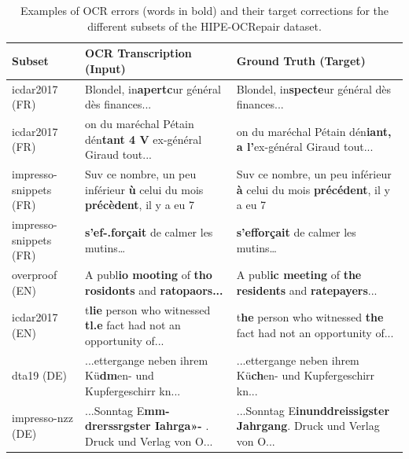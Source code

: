 \documentclass[11pt]{extarticle}
\begin{document}
\begin{table}[H]
    \centering
    \renewcommand{\arraystretch}{1.5}
    \begin{tabular}{>{\raggedright\arraybackslash}p{2.5cm} >{\raggedright\arraybackslash}p{6cm} >{\raggedright\arraybackslash}p{6cm}}
    \toprule
    \textbf{Subset} & \textbf{OCR Transcription (Input)} & \textbf{Ground Truth (Target)} \\
    \midrule
    
    icdar2017 (FR) & 
    Blondel, in\textbf{apertc}ur général dès finances... & 
    Blondel, in\textbf{specte}ur général dès finances... \\
    
    icdar2017 (FR) & 
    on du maréchal Pétain dén\textbf{tant 4 V  }ex-général Giraud tout... & 
    on du maréchal Pétain dén\textbf{iant, a l'}ex-général Giraud tout... \\
    
    impresso-snippets (FR) & 
    Suv ce nombre, un peu inférieur \textbf{ù} celui du mois \textbf{précèdent}, il y a eu 7 & 
    Suv ce nombre, un peu inférieur \textbf{à} celui du mois \textbf{précédent}, il y a eu 7 \\
    
    impresso-snippets (FR) & 
    \textbf{s'ef-.forçait} de calmer les mutins\dots & 
    \textbf{s'efforçait} de calmer les mutins\dots \\
    
    \midrule
    overproof (EN) & 
    A publ\textbf{io mooting} of \textbf{tho rosidonts} and \textbf{ratopaors...} & 
    A publ\textbf{ic meeting} of \textbf{the residents} and \textbf{ratepayers}...\\
    
    icdar2017 (EN) & 
    t\textbf{lie} person who witnessed \textbf{tl.e} fact had not an opportunity of...& 
    t\textbf{he} person who witnessed \textbf{the} fact had not an opportunity of...\\
    
    \midrule
    dta19 (DE) & 
    ...ettergange neben ihrem Kü\textbf{dm}en- und Kupfergeschirr kn... &
    ...ettergange neben ihrem Kü\textbf{ch}en- und Kupfergeschirr kn... \\
    
    impresso-nzz (DE) & 
    ...Sonntag  E\textbf{mm-drerssrgster Iahrga»-  }. Druck und Verlag von O...& 
    ...Sonntag  E\textbf{inunddreissigster Jahrgang}. Druck und Verlag von O... \\
    
    \bottomrule
    \end{tabular}
    \caption{Examples of OCR errors (words in bold) and their target corrections for the different subsets of the HIPE-OCRepair dataset.}
    \label{tab:dataset_examples}
\end{table}
\end{document}
